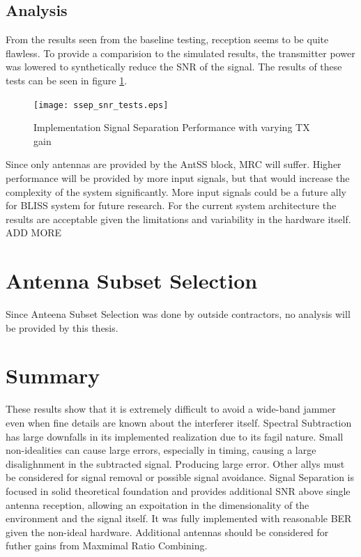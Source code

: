 \subsection{Analysis}

From the results seen from the baseline testing, reception seems to be quite flawless. To provide a comparision to the simulated results, the transmitter power was lowered to synthetically reduce the SNR of the signal.  The results of these tests can be seen in figure \ref{ssep_snr_tests}.   

\begin{figure}\label{ssep_snr_tests}
\texttt{[image: ssep\_snr\_tests.eps]}
\caption{Implementation Signal Separation Performance with varying TX gain}
\end{figure}

Since only antennas are provided by the AntSS block, MRC will suffer.  Higher performance will be provided by more input signals, but that would increase the complexity of the system significantly.  More input signals could be a future ally for BLISS system for future research.  For the current system architecture the results are acceptable given the limitations and variability in the hardware itself.\\
ADD MORE\\

\section{Antenna Subset Selection}

Since Anteena Subset Selection was done by outside contractors, no analysis will be provided by this thesis.  

\section{Summary}

These results show that it is extremely difficult to avoid a wide-band jammer even when fine details are known about the interferer itself.  Spectral Subtraction has large downfalls in its implemented realization due to its fagil nature.  Small non-idealities can cause large errors, especially in timing, causing a large disalighnment in the subtracted signal.  Producing large error.  Other allys must be considered for signal removal or possible signal avoidance.  Signal Separation is focused in solid theoretical foundation and provides additional SNR above single antenna reception, allowing an expoitation in the dimensionality of the environment and the signal itself.  It was fully implemented with reasonable BER given the non-ideal hardware.  Additional antennas should be considered for futher gains from Maxmimal Ratio Combining.\\




